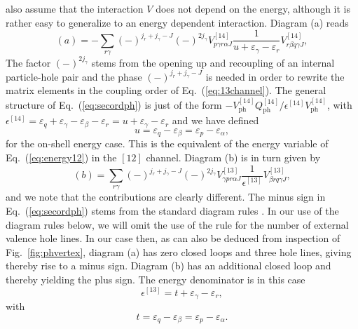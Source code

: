 \documentclass[twoside,12pt]{article}
\begin{document}
also assume that the interaction $V$ does not depend on the energy,
although
it is rather easy to generalize to an energy dependent
interaction.
Diagram (a) reads
\begin{equation}
      (a)=-\sum_{r\gamma}(-)^{j_r+j_{\gamma}-J}(-)^{2j_{\gamma}}
      V^{[14]}_{p\gamma r\alpha J}
      \frac{1}{u+\varepsilon_{\gamma}-
                \varepsilon_{r}} V^{[14]}_{r\beta q\gamma J},
       \label{eq:secordph}
\end{equation}
The factor $(-)^{2j_{\gamma}}$ stems from the opening up
and recoupling of an internal particle-hole pair \cite{kstop81}
and the phase $(-)^{j_r+j_{\gamma}-J}$ is needed in order
to rewrite the matrix elements in the coupling order of
Eq.\ (\ref{eq:13channel}).
The general structure of Eq.\ (\ref{eq:secordph}) is
just of the form $-V_{\mathrm{ph}}^{[14]}Q^{[14]}_{\mathrm{ph}}/\epsilon^{[14]}V_{\mathrm{ph}}^{[14]}$, with
$ \epsilon^{[14]}=\varepsilon_{q}+\varepsilon_{\gamma}-\varepsilon_{\beta}-
                \varepsilon_{r}=u+\varepsilon_{\gamma}-\varepsilon_{r}$
and we have defined
\begin{equation}
  u=\varepsilon_{q}-\varepsilon_{\beta}=\varepsilon_{p}-\varepsilon_{\alpha},
\end{equation}
for the on-shell energy case.
This is the equivalent of the energy variable of Eq.\ (\ref{eq:energy12}) in
the $[12]$ channel.
Diagram (b) is in turn given by
\begin{equation}
      (b)=\sum_{r\gamma}(-)^{j_r+j_{\gamma}-J}(-)^{2j_{\gamma}}
      V^{[13]}_{\gamma pr\alpha J}
      \frac{1}{\epsilon^{[13]}}V^{[13]}_{\beta rq\gamma J} ,
       \label{eq:secordphdirect}
\end{equation}
and we note that the contributions are clearly different.
The minus sign in Eq.\ (\ref{eq:secordph}) stems from the standard
diagram rules \cite{kstop81}.
In our use of the diagram rules below, we will omit the use
of the rule for the number of external valence hole lines.
In our case then, as can also be deduced from inspection of
Fig.\ \ref{fig:phvertex}, diagram (a) has  zero closed loops and
three hole lines,
giving thereby rise to a minus sign.
Diagram (b) has an additional closed
loop and thereby yielding the plus sign.
The energy denominator is in this case
\begin{equation}
      \epsilon^{[13]}=t+\varepsilon_{\gamma}-\varepsilon_{r},
\end{equation}
with
\begin{equation}
  t=\varepsilon_{q}-\varepsilon_{\beta}=\varepsilon_{p}-\varepsilon_{\alpha}.
\end{equation}
\end{document}
